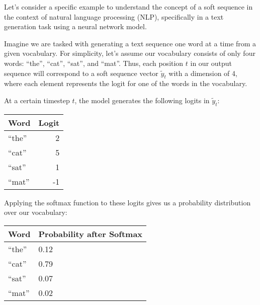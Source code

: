 \documentclass{article}
\newcommand{\quotes}[1]{``#1''}
\begin{document}
Let's consider a specific example to understand the concept of a soft sequence in the context of natural language processing (NLP), specifically in a text generation task using a neural network model.

\newcommand{\quotes}[1]{``#1''}

Imagine we are tasked with generating a text sequence one word at a time from a given vocabulary. For simplicity, let's assume our vocabulary consists of only four words: \quotes{the}, \quotes{cat}, \quotes{sat}, and \quotes{mat}. Thus, each position \(t\) in our output sequence will correspond to a soft sequence vector \(\tilde{y}_t\) with a dimension of 4, where each element represents the logit for one of the words in the vocabulary.

At a certain timestep \(t\), the model generates the following logits in \(\tilde{y}_t\):

\begin{center}
    \begin{tabular}{l r}
        \textbf{Word} & \textbf{Logit} \\
        \hline
        \quotes{the}  & 2              \\
        \quotes{cat}  & 5              \\
        \quotes{sat}  & 1              \\
        \quotes{mat}  & -1             \\
    \end{tabular}
\end{center}

Applying the softmax function to these logits gives us a probability distribution over our vocabulary:

\begin{center}
    \begin{tabular}{l p{2.5cm}} %
        \textbf{Word} & \textbf{Probability after Softmax} \\
        \hline
        \quotes{the}  & 0.12                               \\
        \quotes{cat}  & 0.79                               \\
        \quotes{sat}  & 0.07                               \\
        \quotes{mat}  & 0.02                               \\
    \end{tabular}
\end{center}
\end{document}
